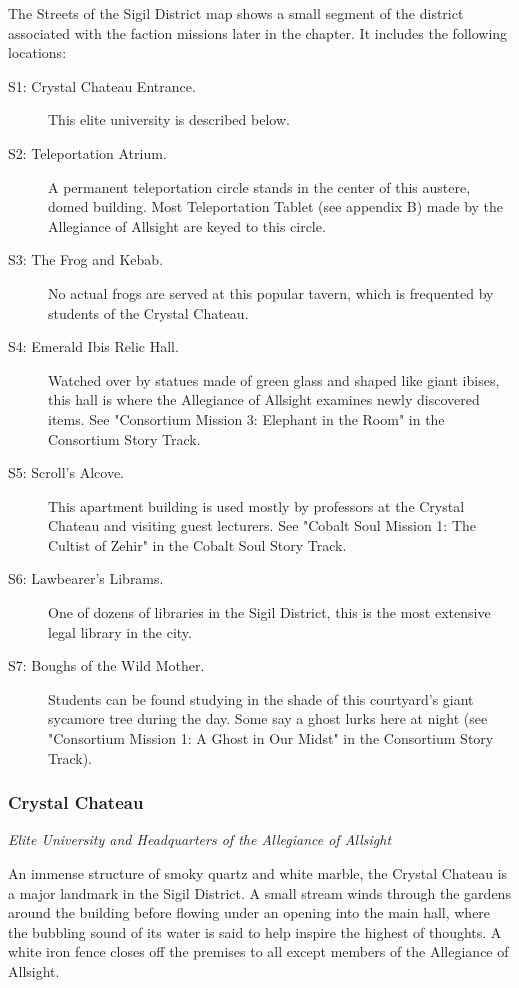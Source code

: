 \documentclass[10pt,a4paper,twoside,fancy,bg=print,twocolumn,openany,nodeprecatedcode]{dndbook}
\begin{document}
The Streets of the Sigil District map shows a small segment of the district associated with the faction missions later in the chapter. It includes the following locations:


\begin{description}
\item[S1: Crystal Chateau Entrance.]
This elite university is described below.
\item[S2: Teleportation Atrium.]
A permanent teleportation circle stands in the center of this austere, domed building. Most Teleportation Tablet (see appendix B) made by the Allegiance of Allsight are keyed to this circle.
\item[S3: The Frog and Kebab.]
No actual frogs are served at this popular tavern, which is frequented by students of the Crystal Chateau.
\item[S4: Emerald Ibis Relic Hall.]
Watched over by statues made of green glass and shaped like giant ibises, this hall is where the Allegiance of Allsight examines newly discovered items. See "Consortium Mission 3: Elephant in the Room" in the Consortium Story Track.
\item[S5: Scroll's Alcove.]
This apartment building is used mostly by professors at the Crystal Chateau and visiting guest lecturers. See "Cobalt Soul Mission 1: The Cultist of Zehir" in the Cobalt Soul Story Track.
\item[S6: Lawbearer's Librams.]
One of dozens of libraries in the Sigil District, this is the most extensive legal library in the city.
\item[S7: Boughs of the Wild Mother.]
Students can be found studying in the shade of this courtyard's giant sycamore tree during the day. Some say a ghost lurks here at night (see "Consortium Mission 1: A Ghost in Our Midst" in the Consortium Story Track).
\end{description}

\subsubsection{Crystal Chateau}
\textit{Elite University and Headquarters of the Allegiance of Allsight}

An immense structure of smoky quartz and white marble, the Crystal Chateau is a major landmark in the Sigil District. A small stream winds through the gardens around the building before flowing under an opening into the main hall, where the bubbling sound of its water is said to help inspire the highest of thoughts. A white iron fence closes off the premises to all except members of the Allegiance of Allsight.
\end{document}
